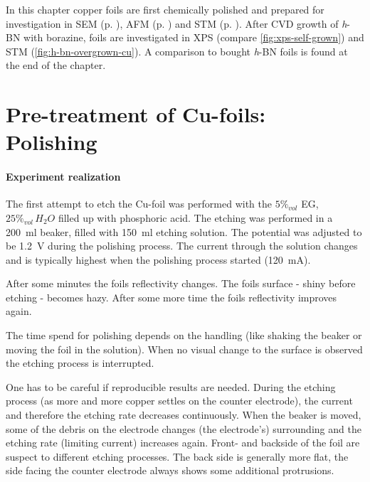 In this chapter copper foils are first chemically polished and prepared for investigation in SEM (p. \pageref{fig:SEM-gb}), AFM (p. \pageref{fig:foil-afm-as-bought}) and STM (p. \pageref{fig:cu-foil-clean-stm}). After CVD growth of \textit{h}-BN with borazine, foils are investigated in XPS (compare \autoref{fig:xps-self-grown}) and STM (\autoref{fig:h-bn-overgrown-cu}). A comparison to bought \textit{h}-BN foils is found at the end of the chapter.


	\section{Pre-treatment of Cu-foils: Polishing}
	
	\paragraph{Experiment realization}The first attempt to etch the Cu-foil was performed with the $5\%_{vol}$ EG, $25\%_{vol}\,H_2O$ filled up with phosphoric acid. The etching was performed in a \SI{200}{\ml} beaker, filled with \SI{150}{\ml} etching solution. The potential was adjusted to be \SI{1.2}{\V} during the polishing process. The current through the solution changes and is typically highest when the polishing process started (\SI{120}{\milli \ampere}). 
	
	After some minutes the foils reflectivity changes. The foils surface - shiny before etching - becomes hazy. After some more time the foils reflectivity improves again. 
	
	The time spend for polishing depends on the handling (like shaking the beaker or moving the foil in the solution). When no visual change to the surface is observed the etching process is interrupted. 
	
	One has to be careful if reproducible results are needed. During the etching process (as more and more copper settles on the counter electrode), the current and therefore the etching rate decreases continuously. When the beaker is moved, some of the debris on the electrode changes (the electrode's) surrounding and the etching rate (limiting current) increases again. 
	Front- and backside of the foil are suspect to different etching processes. The back side is generally more flat, the side facing the counter electrode always shows some additional protrusions.
	
